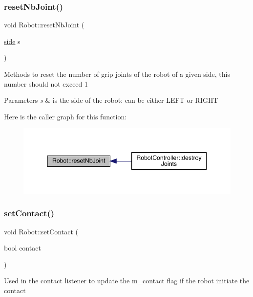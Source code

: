 \subsubsection{\texorpdfstring{reset\+Nb\+Joint()}{resetNbJoint()}}
{\footnotesize\ttfamily void Robot\+::reset\+Nb\+Joint (\begin{DoxyParamCaption}\item[{\mbox{\hyperlink{_robot_8h_afc015eff6557e84151d2e53b94375445}{side}}}]{s }\end{DoxyParamCaption})}

Methods to reset the number of grip joints of the robot of a given side, this number should not exceed 1 
\begin{DoxyParams}{Parameters}
{\em s} & is the side of the robot\+: can be either L\+E\+FT or R\+I\+G\+HT \\
\hline
\end{DoxyParams}
Here is the caller graph for this function\+:\nopagebreak
\begin{figure}[H]
\begin{center}
\leavevmode
\includegraphics[width=345pt]{class_robot_abbba5cddb2dc90005c26b99d968f102d_icgraph}
\end{center}
\end{figure}
\mbox{\label{class_robot_af0d391d121096fa6f2d214bb8910c0a1}} 
\subsubsection{\texorpdfstring{set\+Contact()}{setContact()}}
{\footnotesize\ttfamily void Robot\+::set\+Contact (\begin{DoxyParamCaption}\item[{bool}]{contact }\end{DoxyParamCaption})}

Used in the contact listener to update the m\+\_\+contact flag if the robot initiate the contact

